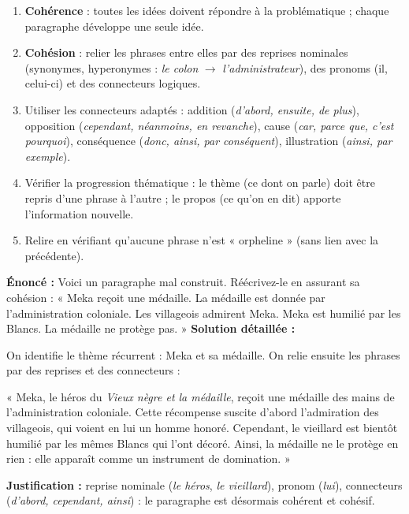 \documentclass[11pt]{article}
\newcommand{\cle}[1]{{\popxbold\color{popdark}#1}}
\begin{document}
\begin{methode}
\begin{enumerate}
\item \textbf{Cohérence} : toutes les idées doivent répondre à la problématique ; chaque paragraphe développe une seule idée.
\item \textbf{Cohésion} : relier les phrases entre elles par des \cle{reprises nominales} (synonymes, hyperonymes : \emph{le colon} $\to$ \emph{l'administrateur}), des \cle{pronoms} (il, celui-ci) et des \cle{connecteurs logiques}.
\item Utiliser les connecteurs adaptés : addition (\emph{d'abord, ensuite, de plus}), opposition (\emph{cependant, néanmoins, en revanche}), cause (\emph{car, parce que, c'est pourquoi}), conséquence (\emph{donc, ainsi, par conséquent}), illustration (\emph{ainsi, par exemple}).
\item Vérifier la \cle{progression thématique} : le thème (ce dont on parle) doit être repris d'une phrase à l'autre ; le propos (ce qu'on en dit) apporte l'information nouvelle.
\item Relire en vérifiant qu'aucune phrase n'est « orpheline » (sans lien avec la précédente).
\end{enumerate}
\end{methode}

\begin{exoresolu}
\textbf{Énoncé :} Voici un paragraphe mal construit. Réécrivez-le en assurant sa cohésion : « Meka reçoit une médaille. La médaille est donnée par l'administration coloniale. Les villageois admirent Meka. Meka est humilié par les Blancs. La médaille ne protège pas. »
\tcblower
\textbf{Solution détaillée :}
\par On identifie le thème récurrent : Meka et sa médaille. On relie ensuite les phrases par des reprises et des connecteurs :
\par « Meka, le héros du \emph{Vieux nègre et la médaille}, reçoit une médaille des mains de l'administration coloniale. Cette récompense suscite d'abord l'admiration des villageois, qui voient en lui un homme honoré. Cependant, le vieillard est bientôt humilié par les mêmes Blancs qui l'ont décoré. Ainsi, la médaille ne le protège en rien : elle apparaît comme un instrument de domination. »
\par \textbf{Justification :} reprise nominale (\emph{le héros}, \emph{le vieillard}), pronom (\emph{lui}), connecteurs (\emph{d'abord, cependant, ainsi}) : le paragraphe est désormais cohérent et cohésif.
\end{exoresolu}
\end{document}
